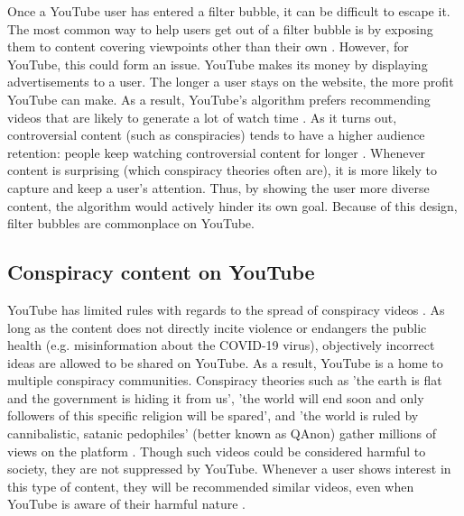 \documentclass[../main.tex]{subfiles}
\begin{document}
Once a YouTube user has entered a filter bubble, it can be difficult to escape it. The most common way to 
help users get out of a filter bubble is by exposing them to content covering viewpoints other than their own
\citep{bozdag2015breaking}. However, for YouTube, this could form an issue. YouTube makes its money by 
displaying advertisements to a user. The longer a user stays on the website, the more profit YouTube can 
make. As a result, YouTube's algorithm prefers recommending videos that are likely to generate a lot of watch
time \citep{maack_2019}. As it turns out, controversial content (such as conspiracies) tends to have a higher
audience retention: people keep watching controversial content for longer \citep{birch2019white}. Whenever 
content is surprising (which conspiracy theories often are), it is more likely to capture and keep a user's 
attention. Thus, by showing the user more diverse content, the algorithm would actively hinder its own goal.
Because of this design, filter bubbles are commonplace on YouTube. 

\subsection{Conspiracy content on YouTube}
YouTube has limited rules with regards to the spread of conspiracy videos \citep{youtube_2021}. As long
as the content does not directly incite violence or endangers the public health (e.g. misinformation
about the COVID-19 virus), objectively incorrect ideas are allowed to be shared on YouTube. As a result,
YouTube is a home to multiple conspiracy communities. Conspiracy theories such as 'the earth is flat and
the government is hiding it from us', 'the world will end soon and only followers of this specific
religion will be spared', and 'the world is ruled by cannibalistic, satanic pedophiles' (better known as
QAnon) gather millions of views on the platform \citep{paolillo2018flat, miller2021characterizing}.
Though such videos could be considered harmful to society, they are not suppressed by YouTube. Whenever
a user shows interest in this type of content, they will be recommended similar videos, even when
YouTube is aware of their harmful nature \citep{ledwich2020algorithmic, maack_2019}.
\end{document}
